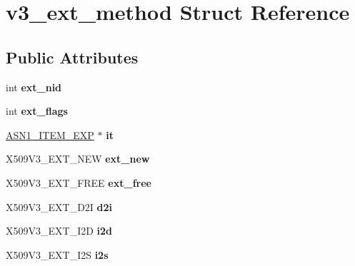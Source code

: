 \hypertarget{structv3__ext__method}{}\section{v3\+\_\+ext\+\_\+method Struct Reference}
\label{structv3__ext__method}
\subsection*{Public Attributes}
\begin{DoxyCompactItemize}
\item 
\mbox{\label{structv3__ext__method_ad9f39327ffdb8ffb8cfdbea5a3081600}} 
int {\bfseries ext\+\_\+nid}
\item 
\mbox{\label{structv3__ext__method_aa3e784b4aad755aa1c7d3b21b14d68d8}} 
int {\bfseries ext\+\_\+flags}
\item 
\mbox{\label{structv3__ext__method_a6f57d2623c9652447056936691e7325f}} 
\hyperlink{struct_a_s_n1___i_t_e_m__st}{A\+S\+N1\+\_\+\+I\+T\+E\+M\+\_\+\+E\+XP} $\ast$ {\bfseries it}
\item 
\mbox{\label{structv3__ext__method_a91b49ad85108d38d4acad8a29562c433}} 
X509\+V3\+\_\+\+E\+X\+T\+\_\+\+N\+EW {\bfseries ext\+\_\+new}
\item 
\mbox{\label{structv3__ext__method_ac5cc2cd14dacbf0cefad5daa6481ee53}} 
X509\+V3\+\_\+\+E\+X\+T\+\_\+\+F\+R\+EE {\bfseries ext\+\_\+free}
\item 
\mbox{\label{structv3__ext__method_affd83034cb2127f5c95827e92532d7da}} 
X509\+V3\+\_\+\+E\+X\+T\+\_\+\+D2I {\bfseries d2i}
\item 
\mbox{\label{structv3__ext__method_af61d993d88060b09737ed999339817f5}} 
X509\+V3\+\_\+\+E\+X\+T\+\_\+\+I2D {\bfseries i2d}
\item 
\mbox{\label{structv3__ext__method_ae6b9e63922dfd426a4bd8cda4c8719a5}} 
X509\+V3\+\_\+\+E\+X\+T\+\_\+\+I2S {\bfseries i2s}
\item 
\mbox{\label{structv3__ext__method_afe843df7c11d126f43aa7ed05538d572}} 

\end{DoxyCompactItemize}
